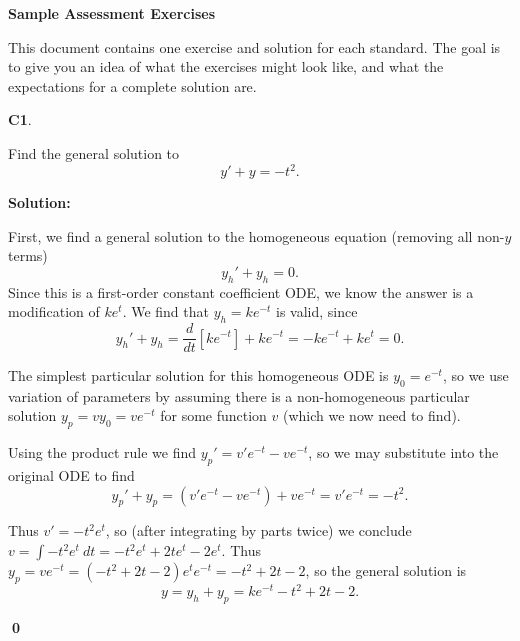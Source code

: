 \documentclass{article}
\newenvironment{problem}[1]
{
  \begin{flushleft}
  \textbf{#1}.
  \ignorespaces
}
{
  \end{flushleft}
}
\newenvironment{solution}
{
  \ignorespaces
  \textbf{Solution:}
}
{
  \ignorespacesafterend
  \begin{flushright}
  {\bfseries \qed}
  \end{flushright}
}
\begin{document}
\begin{center}
\Large \textbf{Sample Assessment Exercises}
\end{center}

This document contains one exercise and solution for each standard.
The goal is to give you an idea of what the exercises might look like,
and what the expectations for a complete solution are.



\begin{problem}{C1}
Find the general solution to \[y'+y=-t^2.\]
\end{problem}
\begin{solution}
First, we find a general solution to the homogeneous equation (removing all non-\(y\) terms) 
\[y_h'+y_h=0.\]
Since this is a first-order constant coefficient ODE, we know the answer is a modification of
\(ke^t\). We find that \(y_h=ke^{-t}\) is valid, since
\[y_h'+y_h=\frac{d}{dt}[ke^{-t}]+ke^{-t}=-ke^{-t}+ke^{t}=0.\]

The simplest particular solution for this homogeneous ODE is \(y_0=e^{-t}\),
so we use variation of parameters by assuming there is a non-homogeneous particular solution
\(y_p=vy_0=ve^{-t}\) for some function \(v\) (which we now need to find).

Using the product rule we find \(y_p' = v'e^{-t}-ve^{-t}\), so we may substitute into the original ODE to find
\[y_p ' + y_p = (v'e^{-t}-ve^{-t}) + ve^{-t} = v'e^{-t}=-t^2.\]

Thus \(v'=-t^2e^t\), so (after integrating by parts twice) we conclude \(v=\int -t^2 e^t\ dt  = -t^2 e^t +2te^t-2e^t\).  
Thus \(y_p = ve^{-t} = (-t^2+2t-2)e^te^{-t}=-t^2+2t-2\), so the general solution is 
\[y=y_h+y_p=ke^{-t}-t^2+2t-2.\]
\end{solution}
\end{document}
